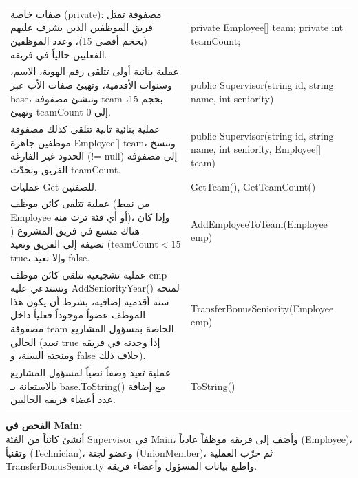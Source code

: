 \documentclass[14pt]{extarticle}
\begin{document}
\begin{enumerate}[resume, label=\textbf{تمرين \arabic*:}, wide=0pt, leftmargin=*, itemsep=2em]
    {\centering
    \renewcommand{\arraystretch}{1.2}
    \small
    \begin{tabular}{|>{\raggedleft\arraybackslash}p{}|>{\raggedright\arraybackslash}p{}|}
    \hline
    \multicolumn{2}{|c|}{\textbf{الفئة الفرعية: \textenglish{Supervisor : Employee}}} \\
    \hline
    صفات خاصة (\textenglish{private}): مصفوفة تمثل فريق الموظفين الذين يشرف عليهم (بحجم أقصى 15)، وعدد الموظفين الفعليين حالياً في فريقه. & \textenglish{private Employee[] team;} \newline \textenglish{private int teamCount;} \\
    \hline
    عملية بنائية أولى تتلقى رقم الهوية، الاسم، وسنوات الأقدمية، وتهيئ صفات الأب عبر \textenglish{base}، وتنشئ مصفوفة \textenglish{team} بحجم 15، وتهيئ \textenglish{teamCount} إلى \textenglish{0}. & \textenglish{public Supervisor(string id, string name, int seniority)} \\
    \hline
    عملية بنائية ثانية تتلقى كذلك مصفوفة موظفين جاهزة \textenglish{Employee[] team}، وتنسخ الحدود غير الفارغة (\textenglish{!= null}) إلى مصفوفة الفريق وتحدّث \textenglish{teamCount}. & \textenglish{public Supervisor(string id, string name, int seniority, Employee[] team)} \\
    \hline
    عمليات \textenglish{Get} للصفتين. & \textenglish{GetTeam(), GetTeamCount()} \\
    \hline
    عملية تتلقى كائن موظف (من نمط \textenglish{Employee} أو أي فئة ترث منه)، وإذا كان هناك متسع في فريق المشروع ($\text{teamCount} < 15$) تضيفه إلى الفريق وتعيد \textenglish{true}، وإلا تعيد \textenglish{false}. & \textenglish{AddEmployeeToTeam(Employee emp)} \\
    \hline
    عملية تشجيعية تتلقى كائن موظف \textenglish{emp} وتستدعي عليه \textenglish{AddSeniorityYear()} لمنحه سنة أقدمية إضافية، بشرط أن يكون هذا الموظف عضواً موجوداً فعلياً داخل مصفوفة \textenglish{team} الخاصة بمسؤول المشاريع الحالي (تعيد \textenglish{true} إذا وجدته في فريقه ومنحته السنة، و \textenglish{false} خلاف ذلك). & \textenglish{TransferBonusSeniority(Employee emp)} \\
    \hline
    عملية تعيد وصفاً نصياً لمسؤول المشاريع بالاستعانة بـ \textenglish{base.ToString()} مع إضافة عدد أعضاء فريقه الحاليين. & \textenglish{ToString()} \\
    \hline
    \end{tabular}
    \par} %

    \vspace{2em}
    \noindent \textbf{الفحص في \textenglish{Main}:} \\
    أنشئ كائناً من الفئة \textenglish{Supervisor} في \textenglish{Main}، وأضف إلى فريقه موظفاً عادياً (\textenglish{Employee})، وتقنياً (\textenglish{Technician})، وعضو لجنة (\textenglish{UnionMember})، ثم جرّب العملية \\
     \textenglish{TransferBonusSeniority} واطبع بيانات المسؤول وأعضاء فريقه.

\end{enumerate}
\end{document}
